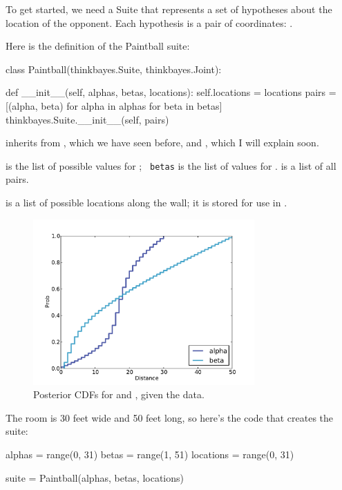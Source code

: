 \documentclass[12pt]{book}
\theoremstyle{exercise}
\begin{document}
To get started, we need a Suite that represents a set of hypotheses
about the location of the opponent.  Each hypothesis is a
pair of coordinates: .

Here is the definition of the Paintball suite:

\begin{code}
class Paintball(thinkbayes.Suite, thinkbayes.Joint):

    def __init__(self, alphas, betas, locations):
        self.locations = locations
        pairs = [(alpha, beta) 
                 for alpha in alphas 
                 for beta in betas]
        thinkbayes.Suite.__init__(self, pairs)
\end{code}

 inherits from , which we have seen before,
and , which I will explain soon.

 is the list of possible values for ; {\tt
  betas} is the list of values for .   is a list
of all  pairs.

 is a list of possible locations along
the wall; it is stored for use in .

\begin{figure}
\centerline{\includegraphics[height=2.5in]{figs/paintball2.pdf}}
\caption{Posterior CDFs for  and , given the data.}
\label{fig.paintball2}
\end{figure}

The room is 30 feet wide and 50 feet long, so here's the code that
creates the suite:

\begin{code}
    alphas = range(0, 31)
    betas = range(1, 51)
    locations = range(0, 31)

    suite = Paintball(alphas, betas, locations)
\end{code}
\end{document}
